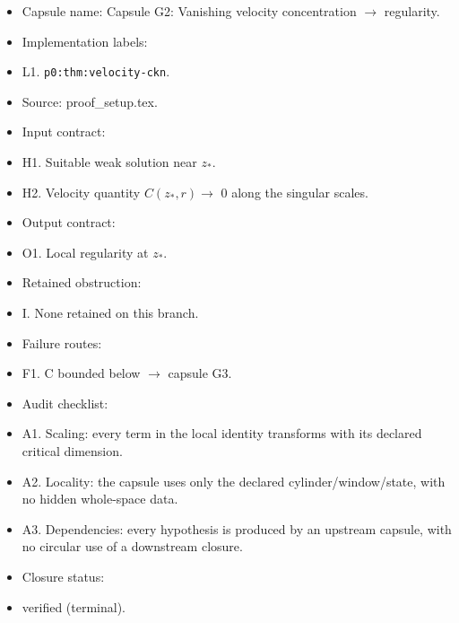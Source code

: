 \documentclass[11pt]{amsart}
\begin{document}
\begin{itemize}
  \item Capsule name: Capsule G2: Vanishing velocity concentration $\to$ regularity.
  \item Implementation labels:
  \item L1. \texttt{p0:thm:velocity-ckn}.
  \item Source: proof\_setup.tex.
  \item Input contract:
  \item H1. Suitable weak solution near $z_*$.
  \item H2. Velocity quantity $C(z_*,r) \to$ 0 along the singular scales.
  \item Output contract:
  \item O1. Local regularity at $z_*$.
  \item Retained obstruction:
  \item I. None retained on this branch.
  \item Failure routes:
  \item F1. C bounded below $\to$ capsule G3.
  \item Audit checklist:
  \item A1. Scaling: every term in the local identity transforms with its declared critical dimension.
  \item A2. Locality: the capsule uses only the declared cylinder/window/state, with no hidden whole-space data.
  \item A3. Dependencies: every hypothesis is produced by an upstream capsule, with no circular use of a downstream closure.
  \item Closure status:
  \item verified (terminal).
\end{itemize}
\end{document}
